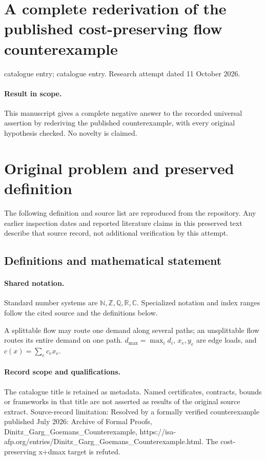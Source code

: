 \documentclass[11pt]{article}
\begin{document}
\section*{A complete rederivation of the published cost-preserving flow counterexample}
\noindent catalogue entry; catalogue entry. Research attempt dated 11 October 2026.
\paragraph{Result in scope.}This manuscript gives a complete negative answer to the recorded universal assertion by rederiving the published counterexample, with every original hypothesis checked. No novelty is claimed.
\section{Original problem and preserved definition}
The following definition and source list are reproduced from the repository. Any earlier inspection dates and reported literature claims in this preserved text describe that source record, not additional verification by this attempt.
\subsection{Definitions and mathematical statement}

\paragraph{Shared notation.}Standard number systems are $\mathbb N,\mathbb Z,\mathbb Q,\mathbb R,\mathbb C$. Specialized notation and index ranges follow the cited source and the definitions below.


A splittable flow may route one demand along several paths; an unsplittable flow routes its entire demand on one path. $d_{\max}=\max_i d_i$, $x_e,y_e$ are edge loads, and $c(x)=\sum_e c_e x_e$.
\paragraph{Record scope and qualifications.}
The catalogue title is retained as metadata. Named certificates, contracts, bounds or frameworks in that title are not asserted as results of the original source extract.
Source-record limitation: Resolved by a formally verified counterexample published July 2026: Archive of Formal Proofs, Dinitz_Garg_Goemans_Counterexample, https://isa-afp.org/entries/Dinitz_Garg_Goemans_Counterexample.html. The cost-preserving x+dmax target is refuted.
\end{document}
